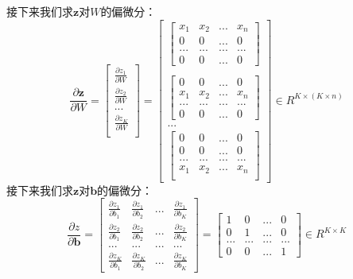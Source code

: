 \documentclass[UTF8]{article}
\begin{document}
接下来我们求$\boldsymbol{z}$对$W$的偏微分：
\begin{equation}
\frac{\partial{ \boldsymbol{z} }}{\partial{ W }}=\begin{bmatrix}
\frac{\partial{z_{1}}}{\partial{W}} \\
\frac{\partial{z_{2}}}{\partial{W}} \\
... \\
\frac{\partial{z_{K}}}{\partial{W}} \\
\end{bmatrix}=\begin{bmatrix}
\begin{bmatrix}
x_{1} & x_{2} & ... & x_{n} \\
0 & 0 & ... &　0 \\
... & ... & ... & ... \\
0 & 0 & ... & 0
\end{bmatrix} \\ \\
\begin{bmatrix}
0 & 0 & ... & 0 \\
x_{1} & x_{2} & ... & x_{n} \\
... & ... & ... & ... \\
0 & 0 & ... & 0
\end{bmatrix} \\
... \\
\begin{bmatrix}
0 & 0 & ... & 0 \\
0 & 0 & ... & 0 \\
... & ... & ... & ... \\
x_{1} & x_{2} & ... & x_{n} \\
\end{bmatrix}
\end{bmatrix} \in R^{K \times (K \times n)}
\label{mlp-pz-pW-def}
\end{equation}
接下来我们求$\boldsymbol{z}$对$\boldsymbol{b}$的偏微分：
\begin{equation}
\frac{\partial{z}}{\partial{\boldsymbol{b}}}=\begin{bmatrix}
\frac{\partial{z}_{1}}{\partial{b}_{1}} & \frac{\partial{z}_{1}}{\partial{b}_{2}} & ... & \frac{\partial{z}_{1}}{\partial{b}_{K}} \\
\frac{\partial{z}_{2}}{\partial{b}_{1}} & \frac{\partial{z}_{2}}{\partial{b}_{2}} & ... & \frac{\partial{z}_{2}}{\partial{b}_{K}} \\
... & ... & ... & ... \\
\frac{\partial{z}_{K}}{\partial{b}_{1}} & \frac{\partial{z}_{K}}{\partial{b}_{2}} & ... & \frac{\partial{z}_{K}}{\partial{b}_{K}}
\end{bmatrix} = \begin{bmatrix}
1 & 0 & ... & 0 \\
0 & 1 & ... & 0 \\
... & ... & ... & ... \\
0 & 0 & ... & 1
\end{bmatrix} \in R^{K \times K}
\label{mlp-pz-pb-def}
\end{equation}
\end{document}
